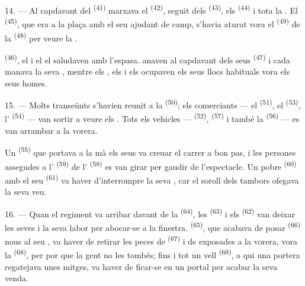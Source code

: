 14. --- Al capdavant del  \textsuperscript{(41)} marxava el
 \textsuperscript{(42)}, seguit dels 
\textsuperscript{(43)}, els  \textsuperscript{(44)} i tota la
. El  \textsuperscript{(45)}, que era a la plaça amb
el seu ajudant de camp, s'havia aturat vora el 
\textsuperscript{(49)} de la  \textsuperscript{(48)} per veure la
.

 \textsuperscript{(46)}, el  i
el  el saludaven amb l'espasa. 
anaven al capdavant dels seus  \textsuperscript{(47)} i cada
 manava la seva , mentre els ,
els  i els  ocupaven els seus llocs
habituals vora els seus homes.

15. --- Molts transeünts s'havien reunit a la 
\textsuperscript{(50)}; els comerciants --- el 
\textsuperscript{(51)}, el  \textsuperscript{(53)}, l'
\textsuperscript{(54)} --- van sortir a veure els . Tots els
vehicles ---  \textsuperscript{(52)},  \textsuperscript{(57)} i també la 
\textsuperscript{(56)} --- es van arrambar a la vorera.

\VUsaut{3.0mm}

Un  \textsuperscript{(55)} que portava a la mà els seus
 va creuar el carrer a bon pas, i les persones
assegudes a l' \textsuperscript{(59)} de l'
\textsuperscript{(58)} es van girar per gaudir de l'espectacle. Un pobre
 \textsuperscript{(60)} amb el seu 
\textsuperscript{(61)} va haver d'interrompre la seva , car el
soroll dels tambors ofegava la seva veu.

16. --- Quan el regiment va arribar davant de la 
\textsuperscript{(64)}, les  \textsuperscript{(63)} i els
 \textsuperscript{(62)} van deixar les seves  i la seva labor per abocar-se a la finestra. 
\textsuperscript{(65)}, que acabava de posar 
\textsuperscript{(66)} nous al seu , va haver de retirar les
peces de  \textsuperscript{(67)} i de  exposades a la
vorera, vora la  \textsuperscript{(68)}, per por que la
gent no les tombés; fins i tot un vell 
\textsuperscript{(69)}, a qui una portera regatejava unes mitges, va haver de
ficar-se en un portal per acabar la seva venda.

